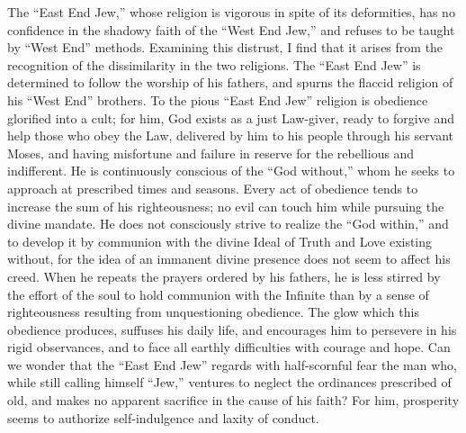The ``East End Jew,'' whose religion is vigorous in spite 
of its deformities, has no confidence in the shadowy faith of 
the ``West End Jew,'' and refuses to be taught by ``West 
End'' methods. Examining this distrust, I find that it 
arises from the recognition of the dissimilarity in the two 
religions. The ``East End Jew'' is determined to follow 
the worship of his fathers, and spurns the flaccid religion 
of his ``West End'' brothers. To the pious ``East End 
Jew'' religion is obedience glorified into a cult; for him, 
God exists as a just Law-giver, ready to forgive and help 
those who obey the Law, delivered by him to his people 
through his servant Moses, and having misfortune and 
failure in reserve for the rebellious and indifferent. He is 
continuously conscious of the ``God without,'' whom he 
seeks to approach at prescribed times and seasons. Every 
act of obedience tends to increase the sum of his righteousness; no evil can touch him while pursuing the divine 
mandate. He does not consciously strive to realize the 
``God within,'' and to develop it by communion with the 
divine Ideal of Truth and Love existing without, for the 
idea of an immanent divine presence does not seem to 
affect his creed. When he repeats the prayers ordered by 
his fathers, he is less stirred by the effort of the soul to 
hold communion with the Infinite than by a sense of 
righteousness resulting from unquestioning obedience. The 
glow which this obedience produces, suffuses his daily life, 
and encourages him to persevere in his rigid observances, 
and to face all earthly difficulties with courage and hope. 
Can we wonder that the ``East End Jew'' regards with 
half-scornful fear the man who, while still calling himself 
``Jew,'' ventures to neglect the ordinances prescribed of old, 
and makes no apparent sacrifice in the cause of his faith? 
For him, prosperity seems to authorize self-indulgence and 
laxity of conduct. 


